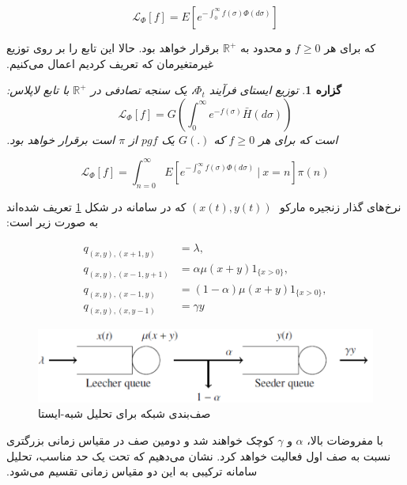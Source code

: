 \documentclass[11pt, oneside]{article}
\newtheorem{proposition}{گزاره}
\begin{document}
\begin{equation*}
\mathcal{L}_\Phi\left[f\right]=E\left[e^{-\int_{0}^{\infty}f(\sigma)\Phi(d\sigma)}\right]
\end{equation*}


‫که برای هر $f\geq0$ و محدود به $\mathbb{R}^+$ برقرار خواهد بود. حالا این تابع را بر روی توزیع غیرمتغیرمان که تعریف کردیم اعمال می‌کنیم.

\begin{proposition}
‫توزیع ایستای فرآیند $\Phi_t$، یک سنجه تصادفی در $\mathbb{R}^+$ با تابع لاپلاس:
\begin{equation}
\mathcal{L}_\Phi\left[f\right]=G\left(\int_{0}^{\infty}e^{-f(\sigma)}\bar{H}(d\sigma)\right)
\end{equation}
‫است که برای هر $f\geq0$ که $G(.)$ یک $pgf$ از $\pi$ است برقرار خواهد بود.
\end{proposition}

\begin{equation}
\mathcal{L}_\Phi\left[f\right]=\int_{n=0}^{\infty}E\left[e^{-\int_{0}^{\infty}f(\sigma)\Phi(d\sigma)}\ |\ x=n\right]\pi(n)
\end{equation}


‫نرخ‌های گذار زنجیره مارکو
‫ $(x(t),y(t))$ که در سامانه در شکل \ref{fig:1} تعریف شده‌اند به صورت زیر است:
‫

\begin{subequations}
\begin{align}
q_{(x,y),(x+1,y)}&=\lambda,\\
q_{(x,y),(x-1,y+1)}&=\alpha\mu(x+y)1_{\{x>0\}},\\
q_{(x,y),(x-1,y)}&=(1-\alpha)\mu(x+y)1_{\{x>0\}},\\
q_{(x,y),(x,y-1)}&=\gamma y
\end{align}
\end{subequations}


\begin{figure}[!ht]
	\centering
	\includegraphics[width=0.8\columnwidth]{resources/fig1.png}
	\caption{صف‌بندی شبکه برای تحلیل شبه-ایستا}
	\label{fig:1}
\end{figure}

‫با مفروضات بالا، $\alpha$ و $\gamma$ کوچک خواهند شد و دومین صف در مقیاس زمانی بزرگتری نسبت به صف اول فعالیت خواهد کرد. نشان می‌دهیم که تحت یک حد مناسب، تحلیل سامانه ترکیبی به این دو مقیاس زمانی تقسیم می‌شود.
\end{document}
